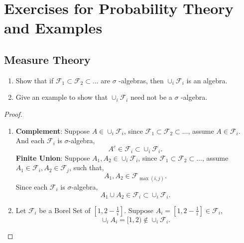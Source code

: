 \chapter{Exercises for Probability Theory and Examples}

\section{Measure Theory}

\begin{exercise}
    \begin{enumerate}
        \item Show that if $\mathcal{F}_{1}\subset \mathcal{F}_{2}\subset\ldots$ are $\sigma$ -algebras, then $\cup_{i}\mathcal{F}_{i}$ is an algebra.
        \item Give an example to show that $\cup_{i}\mathcal{F}_{i}$ need not be a $\sigma$ -algebra.
    \end{enumerate}
\end{exercise}

\begin{proof}
    \begin{enumerate}
        \item
              \textbf{Complement}: Suppose $A\in\cup_{i}\mathcal{F}_{i}$, since $\mathcal{F}_{1}\subset \mathcal{F}_{2}\subset\ldots$, assume $A\in\mathcal{F}_{i}$. And each $\mathcal{F}_{i}$ is $\sigma$-algebra,
              \begin{equation*}
                  A^c\in\mathcal{F}_{i}\subset\cup_{i}\mathcal{F}_{i}.
              \end{equation*}
              \textbf{Finite Union}: Suppose $A_1,A_2\in\cup_{i}\mathcal{F}_{i}$, since $\mathcal{F}_{1}\subset \mathcal{F}_{2}\subset\ldots$, assume $A_1\in\mathcal{F}_{i},A_2\in\mathcal{F}_{j}$, such that,
              \begin{equation*}
                  A_1,A_2\in\mathcal{F}_{\max(i,j)}.
              \end{equation*}
              Since each $\mathcal{F}_{i}$ is $\sigma$-algebra,
              \begin{equation*}
                  A_1\cup A_2\in\mathcal{F}_{i}\subset\cup_{i}\mathcal{F}_{i}.
              \end{equation*}
        \item
              Let $\mathcal{F}_{i}$ be a Borel Set of $[1,2-\frac{1}{i}]$. Suppose $A_i=[1,2-\frac{1}{i}]\in\mathcal{F}_{i}$,
              \begin{equation*}
                  \cup_{i}A_{i}=[1,2)\notin\cup_{i}\mathcal{F}_{i}.
              \end{equation*}
    \end{enumerate}
\end{proof}

